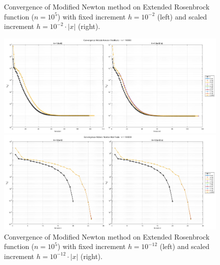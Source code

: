 \documentclass[a4paper,12pt]{article}
\begin{document}
\begin{itemize}
		\newpage
		
		\begin{figure}[H]%
			\caption{Convergence of Modified Newton method on Extended Rosenbrock function ($n = 10^{5}$) with fixed increment $h = 10^{-2}$ (left) and scaled increment $h = 10^{-2}\cdot|x|$ (right).}
			\label{fig:fd_100k_h2}			
			\includegraphics[width=\textwidth]{../immagini/ext_100k_h2.png}
			\endminipage\hfill
			\caption{Convergence of Modified Newton method on Extended Rosenbrock function ($n = 10^{5}$) with fixed increment $h = 10^{-12}$ (left) and scaled increment $h = 10^{-12}\cdot|x|$ (right).}
			\label{fig:fd_100k_h12}
			\includegraphics[width=\textwidth]{../immagini/ext_100k_h12.png}
			\endminipage\hfill
		\end{figure}
		
		
		
		
		
		
		
		\end{itemize}
	
\end{document}
